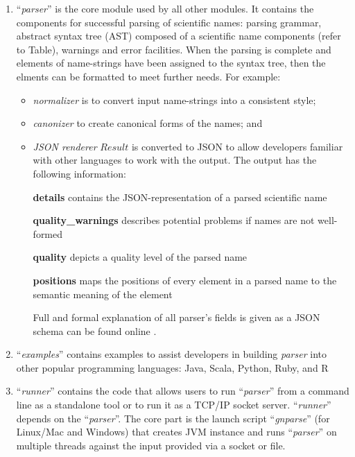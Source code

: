 \documentclass{bmcart}
\begin{document}
\begin{enumerate}

  \item ``\textit{parser}'' is the core module used by all other modules. It
    contains the components for successful parsing of scientific names: parsing
    grammar, abstract syntax tree (AST) composed of a scientific name
    components (refer to Table), warnings and error facilities.  When the
    parsing is complete and elements of name-strings have been assigned to the
    syntax tree, then the elments can be formatted to meet further needs.  For
    example:

\begin{itemize}

  \item \textit{normalizer} is to convert input name-strings into a consistent
    style;

  \item \textit{canonizer} to create canonical forms of the names; and

  \item \textit{JSON renderer}  $Result$ is converted to JSON
    \cite{bray2014javascript} to allow developers familiar with other languages
    to work with the output.  The output has the following information:


\textbf{details} contains the JSON-representation of a parsed scientific name

\textbf{quality\_warnings} describes potential problems if names are not
well-formed

\textbf{quality} depicts a quality level of the parsed name

\textbf{positions} maps the positions of every element in a parsed name to the
semantic meaning of the element

Full and formal explanation of all parser's fields is given as a JSON schema
can be found online \cite{gnparser-json}.

\end{itemize}

  \item ``\textit{examples}'' contains  examples to assist developers in
    building \textit{parser} into other popular programming languages: Java,
    Scala, Python, Ruby, and R

  \item ``\textit{runner}'' contains the code that allows users to run
    ``\textit{parser}'' from a command line as a standalone tool or to run it
    as a TCP/IP socket server. ``\textit{runner}'' depends on the
    ``\textit{parser}''.   The core part is the launch script
    ``\textit{gnparse}'' (for Linux/Mac and Windows) that creates JVM instance
    and runs ``\textit{parser}'' on multiple threads against the input provided
    via a socket or file.


\end{enumerate}
\end{document}
